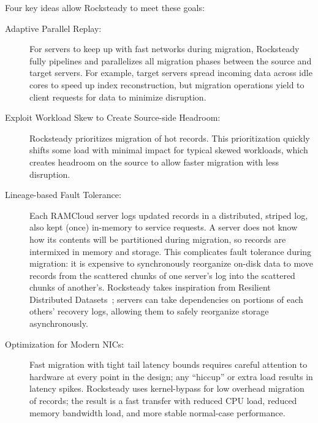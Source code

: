 \noindent
Four key ideas allow Rocksteady to meet these goals:
\begin{description}
\item[Adaptive Parallel Replay:]
For servers to keep up with fast networks during migration, Rocksteady fully
pipelines and parallelizes all migration phases between the source and
target servers. For example, target servers spread incoming data across idle
cores to speed up index reconstruction, but migration operations yield to
client requests for data to minimize disruption.

\item[Exploit Workload Skew to Create Source-side Headroom:] Rocksteady
  prioritizes migration of hot records. This prioritization
  quickly shifts some load with minimal impact for typical skewed
  workloads, which creates headroom on the
  source to allow faster migration with less disruption.

\item[Lineage-based Fault Tolerance:]
Each RAMCloud server logs updated records in a distributed, striped log,
also kept (once) in-memory to service requests. A server does not know how its
contents will be partitioned during migration, so records are intermixed
in memory and storage. This complicates fault tolerance during
migration: it is expensive to synchronously reorganize on-disk data to move
records from the scattered chunks of one server's log into the scattered chunks
of another's.  Rocksteady takes inspiration from
Resilient Distributed Datasets~\cite{spark}; servers can take dependencies
on portions of each others' recovery logs, allowing them to safely
reorganize storage asynchronously.

\item[Optimization for Modern NICs:]
Fast migration with tight tail latency bounds requires careful attention to
hardware at every point in the design; any ``hiccup'' or extra load results in
latency spikes.
Rocksteady uses kernel-bypass for low overhead
migration of records;
the result is a fast
transfer with reduced CPU load, reduced memory bandwidth load, and more
stable normal-case performance.

\end{description}

